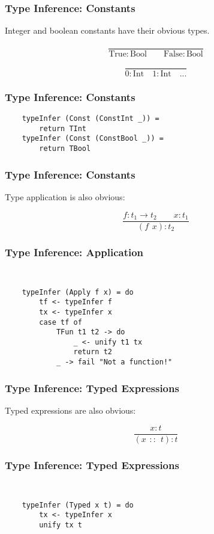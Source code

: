 \documentclass{beamer}
\begin{document}
\begin{frame}
\frametitle{Type Inference: Constants}
\Large{
Integer and boolean constants have their obvious types.

$$\frac{}{\text{True}:\text{Bool}\qquad{}\text{False}:\text{Bool}}$$

\vspace{40pt}

$$\frac{}{0:\text{Int}\quad{}1:\text{Int}\quad{}...}$$
}
\end{frame}

\begin{frame}[fragile]
\frametitle{Type Inference: Constants}

{\tt\large{
\begin{verbatim}
    typeInfer (Const (ConstInt _)) =
        return TInt
    typeInfer (Const (ConstBool _)) =
        return TBool
\end{verbatim}
}}
\end{frame}

\begin{frame}
\frametitle{Type Inference: Constants}
\Large{
Type application is also obvious:

$$\frac{f:t_1 \rightarrow{} t_2\qquad{}x:t_1}{(f\hspace{5pt}x):t_2}$$
}
\end{frame}

\begin{frame}[fragile]
\frametitle{Type Inference: Application}

\Large{
{\tt
\begin{verbatim}
    typeInfer (Apply f x) = do
        tf <- typeInfer f
        tx <- typeInfer x
        case tf of
            TFun t1 t2 -> do
                _ <- unify t1 tx
                return t2
            _ -> fail "Not a function!"
\end{verbatim}
}}
\end{frame}

\begin{frame}
\frametitle{Type Inference: Typed Expressions}
\Large{

Typed expressions are also obvious:

$$\frac{x:t}{(x\hspace{5pt}::\hspace{5pt}t):t}$$
}
\end{frame}

\begin{frame}[fragile]
\frametitle{Type Inference: Typed Expressions}

\Large{
{\tt
\begin{verbatim}
    typeInfer (Typed x t) = do
        tx <- typeInfer x
        unify tx t
\end{verbatim}
}}
\end{frame}
\end{document}

